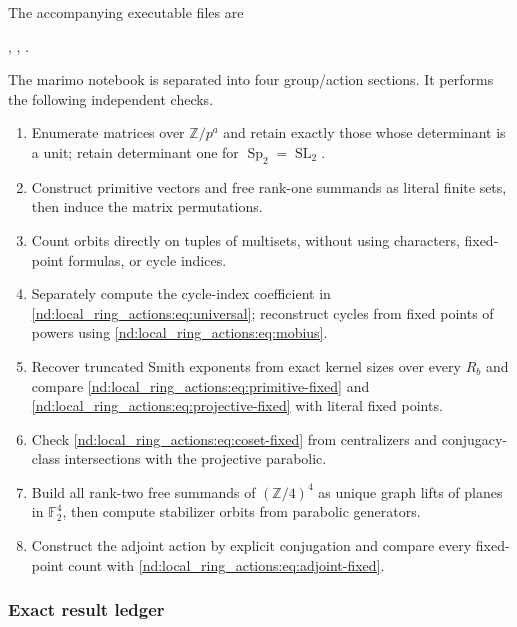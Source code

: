 \documentclass[10pt]{article}
\newcommand{\F}{\mathbb F}
\newcommand{\SL}{\operatorname{SL}}
\newcommand{\Sp}{\operatorname{Sp}}
\begin{document}
The accompanying executable files are
\begin{center}
,\qquad
{},\qquad
{}.
\end{center}
The marimo notebook is separated into four group/action sections.  It performs
the following independent checks.
\begin{enumerate}
\item Enumerate matrices over $\mathbb Z/p^a$ and retain exactly those whose
determinant is a unit; retain determinant one for $\Sp_2=\SL_2$.
\item Construct primitive vectors and free rank-one summands as literal finite
sets, then induce the matrix permutations.
\item Count orbits directly on tuples of multisets, without using characters,
fixed-point formulas, or cycle indices.
\item Separately compute the cycle-index coefficient in
\eqref{nd:local_ring_actions:eq:universal}; reconstruct cycles from fixed points of powers using
\eqref{nd:local_ring_actions:eq:mobius}.
\item Recover truncated Smith exponents from exact kernel sizes over every
$R_b$ and compare \eqref{nd:local_ring_actions:eq:primitive-fixed} and
\eqref{nd:local_ring_actions:eq:projective-fixed} with literal fixed points.
\item Check \eqref{nd:local_ring_actions:eq:coset-fixed} from centralizers and conjugacy-class
intersections with the projective parabolic.
\item Build all rank-two free summands of $(\mathbb Z/4)^4$ as unique graph
lifts of planes in $\F_2^4$, then compute stabilizer orbits from parabolic
generators.
\item Construct the adjoint action by explicit conjugation and compare every
fixed-point count with \eqref{nd:local_ring_actions:eq:adjoint-fixed}.
\end{enumerate}

\subsubsection{Exact result ledger}
\end{document}
